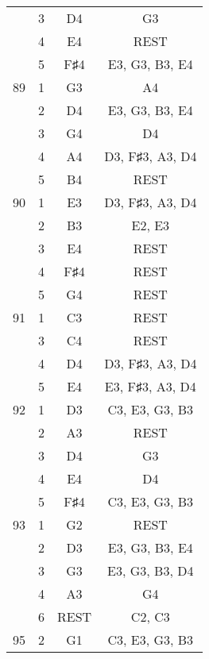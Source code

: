 \documentclass{article}
\begin{document}
\begin{longtable}{|c|c|c|c|}
  & 3 & D4 & G3 \\ 
  & 4 & E4 & REST \\ 
  & 5 & F♯4 & E3, G3, B3, E4 \\ 
\hline
89 & 1 & G3 & A4 \\ 
  & 2 & D4 & E3, G3, B3, E4 \\ 
  & 3 & G4 & D4 \\ 
  & 4 & A4 & D3, F♯3, A3, D4 \\ 
  & 5 & B4 & REST \\ 
\hline
90 & 1 & E3 & D3, F♯3, A3, D4 \\ 
  & 2 & B3 & E2, E3 \\ 
  & 3 & E4 & REST \\ 
  & 4 & F♯4 & REST \\ 
  & 5 & G4 & REST \\ 
\hline
91 & 1 & C3 & REST \\ 
  & 3 & C4 & REST \\ 
  & 4 & D4 & D3, F♯3, A3, D4 \\ 
  & 5 & E4 & E3, F♯3, A3, D4 \\ 
\hline
92 & 1 & D3 & C3, E3, G3, B3 \\ 
  & 2 & A3 & REST \\ 
  & 3 & D4 & G3 \\ 
  & 4 & E4 & D4 \\ 
  & 5 & F♯4 & C3, E3, G3, B3 \\ 
\hline
93 & 1 & G2 & REST \\ 
  & 2 & D3 & E3, G3, B3, E4 \\ 
  & 3 & G3 & E3, G3, B3, D4 \\ 
  & 4 & A3 & G4 \\ 
  & 6 & REST & C2, C3 \\ 
\hline
95 & 2 & G1 & C3, E3, G3, B3 \\ 
\hline
\end{longtable}
\end{document}
